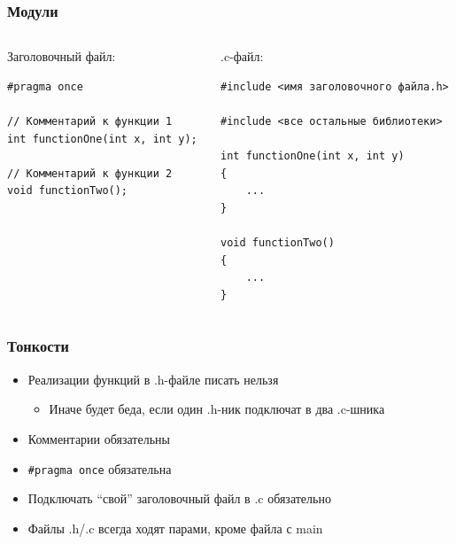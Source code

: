 \documentclass[aspectratio=169]{beamer}
\begin{document}
\begin{frame}[fragile]
    \frametitle{Модули}

    \begin{columns}[t]
        \begin{column}{0.45\linewidth}
            Заголовочный файл:
            \begin{verbatim}
#pragma once

// Комментарий к функции 1
int functionOne(int x, int y);

// Комментарий к функции 2
void functionTwo();
            \end{verbatim}
        \end{column}
        \begin{column}{0.45\linewidth}
            .c-файл:
            \begin{verbatim}
#include <имя заголовочного файла.h>

#include <все остальные библиотеки>

int functionOne(int x, int y)
{
    ...
}

void functionTwo()
{
    ...
}

            \end{verbatim}
        \end{column}
    \end{columns}
\end{frame}

\begin{frame}
    \frametitle{Тонкости}
    \begin{itemize}
        \item Реализации функций в .h-файле писать нельзя
              \begin{itemize}
                  \item Иначе будет беда, если один .h-ник подключат в два .c-шника
              \end{itemize}
        \item Комментарии обязательны
        \item \texttt{\#pragma once} обязательна
        \item Подключать \enquote{свой} заголовочный файл в .c обязательно
        \item Файлы .h/.c всегда ходят парами, кроме файла с main
    \end{itemize}
\end{frame}
\end{document}
